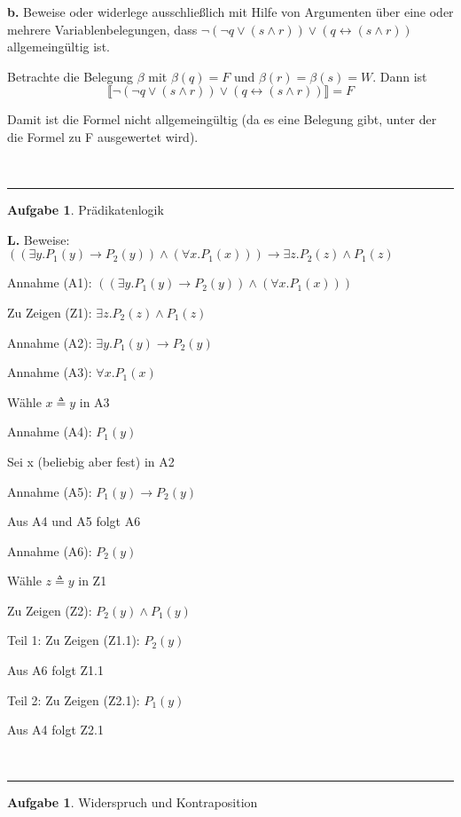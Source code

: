 \documentclass[10pt,leqno ]{article}
\theoremstyle{definition}
\newtheorem{problem}[theorem]{Aufgabe}
\newenvironment{solution}[1][L]{\begin{doublespace}\textbf{#1.}\quad }{\ \rule{0.5em}{0.5em}\end{doublespace}}
\begin{document}
\begin{solution}[b]
Beweise oder widerlege ausschließlich mit Hilfe von Argumenten über eine oder mehrere Variablenbelegungen, dass \( \lnot (\lnot q \lor (s \land r)) \lor (q \leftrightarrow (s \land r)) \) allgemeingültig ist.

Betrachte die Belegung \( \beta \) mit \( \beta (q) = F \) und \( \beta (r) = \beta (s) = W \). Dann ist
\[ \llbracket \lnot (\lnot q \lor (s \land r)) \lor (q \leftrightarrow (s \land r)) \rrbracket = F \]

Damit ist die Formel nicht allgemeingültig (da es eine Belegung gibt, unter der die Formel zu F ausgewertet wird).

\end{solution}
    
\begin{problem}
    Prädikatenlogik
\end{problem}

\begin{solution}
Beweise: \( ((\exists y . P_1(y) \rightarrow P_2(y)) \land (\forall x . P_1(x))) \rightarrow \exists z . P_2(z) \land P_1(z) \)

Annahme (A1): \( ((\exists y . P_1(y) \rightarrow P_2(y)) \land (\forall x . P_1(x))) \)

Zu Zeigen (Z1): \( \exists z . P_2(z) \land P_1(z) \)

Annahme (A2): \( \exists y . P_1(y) \rightarrow P_2(y) \)

Annahme (A3): \( \forall x . P_1(x) \)

Wähle \(  x \triangleq y \) in A3

Annahme (A4): \( P_1(y) \)

Sei x (beliebig aber fest) in A2

Annahme (A5): \( P_1(y) \rightarrow P_2(y) \)

Aus A4 und A5 folgt A6

Annahme (A6): \( P_2(y) \)

Wähle \( z \triangleq y \) in Z1

Zu Zeigen (Z2): \( P_2(y) \land P_1(y) \)

Teil 1: Zu Zeigen (Z1.1): \( P_2(y) \)

\qquad Aus A6 folgt Z1.1

Teil 2: Zu Zeigen (Z2.1): \( P_1(y) \)

\qquad Aus A4 folgt Z2.1

\end{solution}

\begin{problem}
    Widerspruch und Kontraposition
\end{problem}
\end{document}

